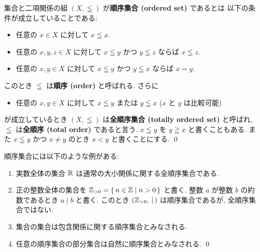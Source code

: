 \documentclass[12pt,twoside]{jarticle}
\begin{document}
\begin{definition}[順序集合]
  集合と二項関係の組 $(X,\leqq)$ が{\bf 順序集合 (ordered set)} であるとは
  以下の条件が成立していることである:
  \begin{itemize}
  \item 任意の $x\in X$ に対して $x\leqq x$.
  \item 任意の $x,y,z\in X$ に対して $x\leqq y$ かつ $y\leqq z$ 
    ならば $x\leqq z$.
  \item 任意の $x,y\in X$ に対して $x\leqq y$ かつ $y\leqq x$ 
    ならば $x = y$.
  \end{itemize}
  このとき $\leqq$ は{\bf 順序 (order)} と呼ばれる. さらに
  \begin{itemize}
  \item 任意の $x,y\in X$ に対して $x\leqq y$ または $y\leqq x$
    \enspace ($x$ と $y$ は比較可能)
  \end{itemize}
  が成立しているとき $(X,\leqq)$ は{\bf 全順序集合 (totally ordered set)} 
  と呼ばれ, $\leqq$ は{\bf 全順序 (total order)} であると言う.
  $x\leqq y$ を $y\geqq x$ と書くこともある.
  また $x\leqq y$ かつ $x\ne y$ のとき $x<y$ と書くことにする.
  \qed
\end{definition}

\begin{example}[順序集合の例]
  順序集合には以下のような例がある:
  \begin{enumerate}
  \item 実数全体の集合 ${\mathbb R}$ は通常の大小関係に関する全順序集合である.
  \item 正の整数全体の集合を ${\mathbb Z}_{>0}=\{\,n\in{\mathbb Z}\mid n>0\,\}$ と書く.
    整数 $a$ が整数 $b$ の約数であるとき $a\mid b$ と書く.
    このとき $({\mathbb Z}_{>0},\,\mid\,)$ は順序集合であるが, 全順序集合ではない.
  \item 集合の集合は包含関係に関する順序集合とみなされる.
  \item 任意の順序集合の部分集合は自然に順序集合とみなされる.
    \qed
  \end{enumerate}
\end{example}
\end{document}
